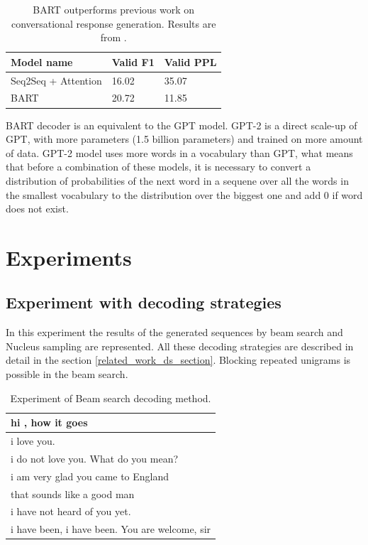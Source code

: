 \begin{table}[ht]
\centering
 \begin{tabular}{|p{5cm}|p{3cm}|p{3cm}|} 
 \hline\hline
 \textbf{Model name} & \textbf{Valid F1} & \textbf{Valid PPL} \\
 \hline\hline
 Seq2Seq + Attention & 16.02 & 35.07 \\
 \hline
 BART & 20.72 & 11.85 \\
 \hline\hline
 \end{tabular}
 \caption{BART outperforms previous work on conversational response generation. Results are from \cite{lewis2019bart}.}
\label{tab:bart_statistic}
\end{table}

BART decoder is an equivalent to the GPT model. GPT-2 is a direct scale-up of GPT, with more parameters (1.5 billion parameters) and trained on more amount of data. GPT-2 model uses more words in a vocabulary than GPT, what means that before a combination of these models, it is necessary to convert a distribution of probabilities of the next word in a sequene over all the words in the smallest vocabulary to the distribution over the biggest one and add 0 if word does not exist. 

\section{Experiments}
\subsection{Experiment with decoding strategies}
In this experiment the results of the generated sequences by beam search and Nucleus sampling are represented. All these decoding strategies are described in detail in the section \ref{related_work_ds_section}. Blocking repeated unigrams is possible in the beam search.
\begin{table}[ht]
\centering
 \begin{tabular}{|p{14cm}|} 
 \hline\hline
 hi , how it goes \\
 \hline
 i love you. \\
 \hline
 i do not love you. What do you mean? \\
 \hline 
 i am very glad you came to England \\
 \hline 
 that sounds like a good man \\
 \hline 
 i have not heard of you yet. \\
 \hline 
 i have been, i have been. You are welcome, sir \\
 \hline\hline
 \end{tabular}
 \caption{Experiment of Beam search decoding method.}
\label{tab:beam_search}
\end{table}

